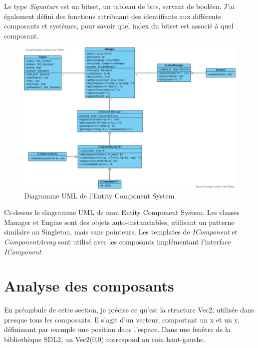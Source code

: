 \documentclass[12pt, openany]{report}
\begin{document}
\par Le type \textit{Signature} est un bitset, un tableau de bits, servant de bool\'een. J'ai \'egalement d\'efini des fonctions attribuant des identifiants aux diff\'erents composants et syst\`emes, pour savoir quel index du bitset est associ\'e \`a quel composant.
\newpage
\begin{figure}[!h]
\centering
\includegraphics[scale=0.4]{umlECS.png}
\caption{Diagramme UML de l'Entity Component System}
\end{figure}
\par Ci-dessus le diagramme UML de mon Entity Component System. Les classes Manager et Engine sont des objets auto-instanciables, utilisant un patterne similaire au Singleton, mais sans pointeurs. Les templates de \textit{IComponent} et \textit{ComponentArray} sont utilis\'e avec les composants impl\'ementant l'interface \textit{IComponent}.

\section{Analyse des composants}
En pr\'eambule de cette section, je pr\'ecise ce qu'est la structure Vec2, utilis\'ee dans presque tous les composants. Il s'agit d'un vecteur, comportant un x et un y, d\'efinissant par exemple une position dans l'espace. Dans une fen\^etre de la biblioth\`eque SDL2, un Vec2(0,0) correspond au coin haut-gauche.
\end{document}
